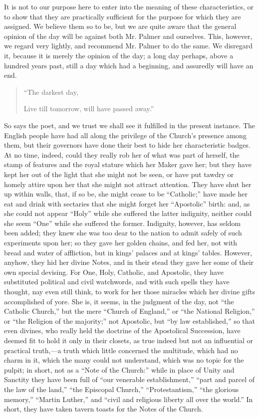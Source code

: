 It is not to our purpose here to enter into the
meaning of these characteristics, or to show that they are practically
sufficient for the purpose for which they are assigned. We believe
them so to be, but we are quite aware that the general opinion of the
day will be against both Mr. Palmer and ourselves. This, however, we
regard very lightly, and recommend Mr. Palmer to do the same. We
disregard it, because it is merely the opinion of the day; a long day
perhaps, above a hundred years past, still a day which had a
beginning, and assuredly will have an end.

\begin{quote}

``The darkest day,

Live till tomorrow, will have passed away.''

\end{quote}

So says the poet, and we trust we shall see it
fulfilled in the present instance. The English people have had all
along the privilege of the Church's presence among them, but their
governors have done their best to hide her characteristic badges. At
no time, indeed, could they really rob her of what was part of
herself, the stamp of features and the royal stature which her Maker
gave her; but they have kept her out of the light that she might not
be seen, or have put tawdry or homely attire upon her that she might
not attract attention. They have shut her up within walls, that, if so
be, she might cease to be ``Catholic;'' have made her eat and drink with
sectaries that she might forget her ``Apostolic'' birth: and, as she
could not appear ``Holy'' while she suffered the latter indignity,
neither could she seem ``One'' while she suffered the former. Indignity,
however, has seldom been added; they knew she was too dear to the
nation to admit safely of such experiments upon her; so they gave her
golden chains, and fed her, not with bread and water of affliction,
but in kings' palaces and at kings' tables. However, anyhow, they hid
her divine Notes, and in their stead they gave her some of their own
special devising. For One, Holy, Catholic, and Apostolic, they have
substituted political and civil watchwords, and with such spells they
have thought, nay even still think, to work for her those miracles
which her divine gifts accomplished of yore. She is, it seems, in the
judgment of the day, not ``the Catholic Church,'' but the mere ``Church
of England,'' or ``the National Religion,'' or ``the Religion of the
majority;'' not Apostolic, but ``by law established,'' so that even
divines, who really held the doctrine of the Apostolical Succession,
have deemed fit to hold it only in their closets, as true indeed but
not an influential or practical truth,—a truth which little
concerned the multitude, which had no charm in it, which the many
could not understand, which was no topic for the pulpit; in short, not
as a ``Note of the Church:'' while in place of Unity and Sanctity they
have been full of ``our venerable establishment,'' ``part and parcel of
the law of the land,'' ``the Episcopal Church,'' ``Protestantism,'' ``the
glorious memory,'' ``Martin Luther,'' and ``civil and religious liberty
all over the world.'' In short, they have taken tavern toasts for the
Notes of the Church.

